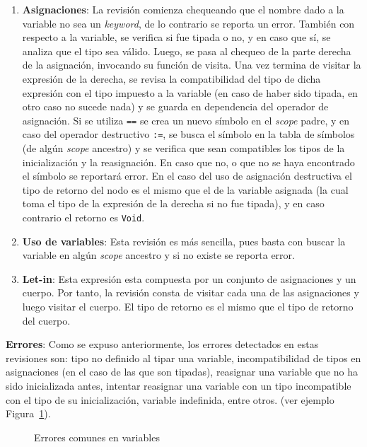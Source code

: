 \documentclass{llncs}
\begin{document}
\begin{enumerate}
    \item \textbf{Asignaciones}: La revisión comienza chequeando que el nombre dado a la variable no sea un \textit{keyword}, de lo contrario se reporta un error. También 
    con respecto a la variable, se verifica si fue tipada o no, y en caso que sí, se analiza que el tipo sea válido. Luego, se pasa al chequeo de la parte derecha de la asignación, 
    invocando su función de visita. Una vez termina de visitar la expresión de la derecha, se revisa la compatibilidad del tipo de dicha expresión con el tipo impuesto a la variable 
    (en caso de haber sido tipada, en otro caso no sucede nada) y se guarda en dependencia del operador de asignación. Si se utiliza \texttt{==} se crea un nuevo símbolo en el
    \textit{scope} padre, y en caso del operador destructivo \texttt{:=}, se busca el símbolo en la tabla de símbolos (de algún \textit{scope} ancestro) y se verifica que sean compatibles 
    los tipos de la inicialización y la reasignación. En caso que no, o que no se haya encontrado el símbolo se reportará error. En el caso del uso de asignación destructiva 
    el tipo de retorno del nodo es el mismo que el de la variable asignada (la cual toma el tipo de la expresión de la derecha si no fue tipada), y en caso contrario el retorno es \texttt{Void}.
    \item \textbf{Uso de variables}: Esta revisión es más sencilla, pues basta con buscar la variable en algún \textit{scope} ancestro y si no existe se reporta error.
    \item \textbf{Let-in}: Esta expresión esta compuesta por un conjunto de asignaciones y un cuerpo. Por tanto, la revisión consta de 
    visitar cada una de las asignaciones y luego visitar el cuerpo. El tipo de retorno es el mismo que el tipo de retorno del cuerpo.
\end{enumerate}

\textbf{Errores}: Como se expuso anteriormente, los errores detectados en estas revisiones son: tipo no definido al tipar una variable, 
incompatibilidad de tipos en asignaciones (en el caso de las que son tipadas), reasignar una variable que no ha sido inicializada antes, intentar reasignar una variable con un tipo incompatible 
con el tipo de su inicialización, variable indefinida, entre otros.  (ver ejemplo Figura~\ref{fig:errores_2}).
\begin{figure}[h]
\centering
\caption{Errores comunes en variables}
\label{fig:errores_2}
\end{figure}
\end{document}
